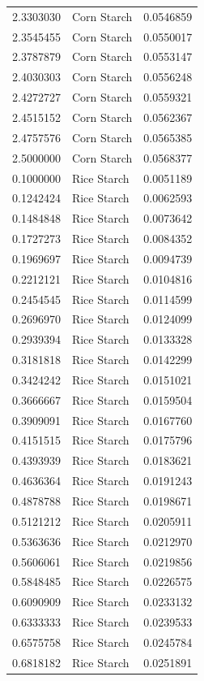 \documentclass[
  12pt,
]{article}
\begin{document}
{\begin{longtable}[]{@{}rlr@{}}
2.3303030 & Corn Starch & 0.0546859 \\
2.3545455 & Corn Starch & 0.0550017 \\
2.3787879 & Corn Starch & 0.0553147 \\
2.4030303 & Corn Starch & 0.0556248 \\
2.4272727 & Corn Starch & 0.0559321 \\
2.4515152 & Corn Starch & 0.0562367 \\
2.4757576 & Corn Starch & 0.0565385 \\
2.5000000 & Corn Starch & 0.0568377 \\
0.1000000 & Rice Starch & 0.0051189 \\
0.1242424 & Rice Starch & 0.0062593 \\
0.1484848 & Rice Starch & 0.0073642 \\
0.1727273 & Rice Starch & 0.0084352 \\
0.1969697 & Rice Starch & 0.0094739 \\
0.2212121 & Rice Starch & 0.0104816 \\
0.2454545 & Rice Starch & 0.0114599 \\
0.2696970 & Rice Starch & 0.0124099 \\
0.2939394 & Rice Starch & 0.0133328 \\
0.3181818 & Rice Starch & 0.0142299 \\
0.3424242 & Rice Starch & 0.0151021 \\
0.3666667 & Rice Starch & 0.0159504 \\
0.3909091 & Rice Starch & 0.0167760 \\
0.4151515 & Rice Starch & 0.0175796 \\
0.4393939 & Rice Starch & 0.0183621 \\
0.4636364 & Rice Starch & 0.0191243 \\
0.4878788 & Rice Starch & 0.0198671 \\
0.5121212 & Rice Starch & 0.0205911 \\
0.5363636 & Rice Starch & 0.0212970 \\
0.5606061 & Rice Starch & 0.0219856 \\
0.5848485 & Rice Starch & 0.0226575 \\
0.6090909 & Rice Starch & 0.0233132 \\
0.6333333 & Rice Starch & 0.0239533 \\
0.6575758 & Rice Starch & 0.0245784 \\
0.6818182 & Rice Starch & 0.0251891 \\

\end{longtable}}
\end{document}
